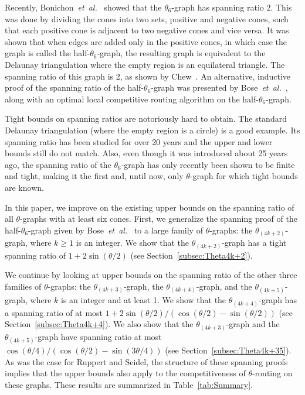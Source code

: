 \documentclass[12pt]{article}
\newcommand{\etal}{\emph{et~al.}\xspace}
\newcommand{\halfgraph}{half-\ensuremath{\theta_6}-graph\xspace}
\newcommand{\graph}[1]{\ensuremath{\theta_{(4 k + #1)}}-graph\xspace}
\begin{document}
Recently, Bonichon~\etal~\cite{BGHI10} showed that the $\theta_6$-graph has spanning ratio 2. This was done by dividing the cones into two sets, positive and negative cones, such that each positive cone is adjacent to two negative cones and vice versa. It was shown that when edges are added only in the positive cones, in which case the graph is called the \halfgraph, the resulting graph is equivalent to the Delaunay triangulation where the empty region is an equilateral triangle. The spanning ratio of this graph is 2, as shown by Chew~\cite{Chew89}. An alternative, inductive proof of the spanning ratio of the \halfgraph was presented by \mbox{Bose~\etal~\cite{BFRV12}}, along with an optimal local competitive routing algorithm on the half-$\theta_6$-graph. 

Tight bounds on spanning ratios are notoriously hard to obtain. The standard Delaunay triangulation (where the empty region is a circle) is a good example. Its spanning ratio has been studied for over 20 years and the upper and lower bounds still do not match. Also, even though it was introduced about 25 years ago, the spanning ratio of the $\theta_6$-graph has only recently been shown to be finite and tight, making it the first and, until now, only $\theta$-graph for which tight bounds are known. 

In this paper, we improve on the existing upper bounds on the spanning ratio of all $\theta$-graphs with at least six cones. First, we generalize the spanning proof of the \halfgraph given by Bose~\etal~\cite{BFRV12} to a large family of $\theta$-graphs: the \graph{2}, where $k \geq 1$ is an integer. We show that the \graph{2} has a tight spanning ratio of $1 + 2 \sin(\theta/2)$ (see Section~\ref{subsec:Theta4k+2}). 

We continue by looking at upper bounds on the spanning ratio of the other three families of $\theta$-graphs: the \graph{3}, the \graph{4}, and the \graph{5}, where $k$ is an integer and at least 1. We show that the \graph{4} has a spanning ratio of at most $1 + 2 \sin(\theta/2) / (\cos(\theta/2) - \sin(\theta/2))$ (see Section~\ref{subsec:Theta4k+4}). We also show that the \graph{3} and the \graph{5} have spanning ratio at most $\cos (\theta/4) / (\cos (\theta/2) - \sin (3\theta/4))$ (see Section~\ref{subsec:Theta4k+35}). As was the case for Ruppert and Seidel, the structure of these spanning proofs implies that the upper bounds also apply to the competitiveness of $\theta$-routing on these graphs. These results are summarized in Table~\ref{tab:Summary}. 
\end{document}
